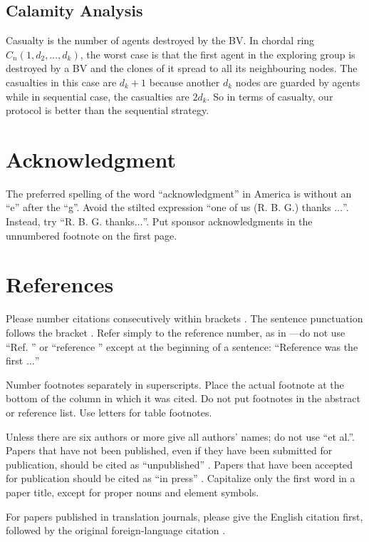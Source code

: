 \subsection{Calamity Analysis}
Casualty is the number of agents destroyed by the BV. In chordal ring $C_n(1, d_2,\dots, d_k)$, the worst case is that the first agent in the exploring group is destroyed by a BV and the clones of it spread to all its neighbouring nodes. The casualties in this case are $d_k+1$ because another $d_k$ nodes are guarded by agents while in sequential case, the casualties are $2d_k$. So in terms of casualty, our protocol is better than the sequential strategy.

\section*{Acknowledgment}

The preferred spelling of the word ``acknowledgment'' in America is without 
an ``e'' after the ``g''. Avoid the stilted expression ``one of us (R. B. 
G.) thanks $\ldots$''. Instead, try ``R. B. G. thanks$\ldots$''. Put sponsor 
acknowledgments in the unnumbered footnote on the first page.

\section*{References}

Please number citations consecutively within brackets \cite{b1}. The 
sentence punctuation follows the bracket \cite{b2}. Refer simply to the reference 
number, as in \cite{b3}---do not use ``Ref. \cite{b3}'' or ``reference \cite{b3}'' except at 
the beginning of a sentence: ``Reference \cite{b3} was the first $\ldots$''

Number footnotes separately in superscripts. Place the actual footnote at 
the bottom of the column in which it was cited. Do not put footnotes in the 
abstract or reference list. Use letters for table footnotes.

Unless there are six authors or more give all authors' names; do not use 
``et al.''. Papers that have not been published, even if they have been 
submitted for publication, should be cited as ``unpublished'' \cite{b4}. Papers 
that have been accepted for publication should be cited as ``in press'' \cite{b5}. 
Capitalize only the first word in a paper title, except for proper nouns and 
element symbols.

For papers published in translation journals, please give the English 
citation first, followed by the original foreign-language citation \cite{b6}.

